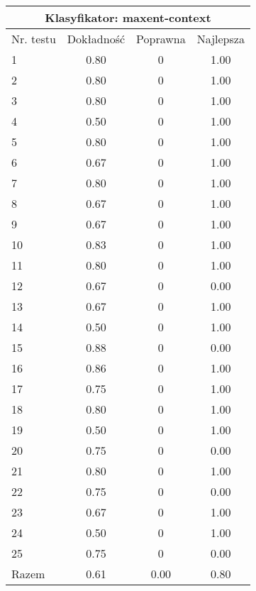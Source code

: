 \begin{tabular}{|l|c|c|c|}
\hline
\multicolumn{4}{|c|}{Klasyfikator: maxent-context}\\
\hline
Nr. testu & Dokładność & Poprawna & Najlepsza\\
\hline
1 & 0.80 & 0 & 1.00 \\
2 & 0.80 & 0 & 1.00 \\
3 & 0.80 & 0 & 1.00 \\
4 & 0.50 & 0 & 1.00 \\
5 & 0.80 & 0 & 1.00 \\
6 & 0.67 & 0 & 1.00 \\
7 & 0.80 & 0 & 1.00 \\
8 & 0.67 & 0 & 1.00 \\
9 & 0.67 & 0 & 1.00 \\
10 & 0.83 & 0 & 1.00 \\
11 & 0.80 & 0 & 1.00 \\
12 & 0.67 & 0 & 0.00 \\
13 & 0.67 & 0 & 1.00 \\
14 & 0.50 & 0 & 1.00 \\
15 & 0.88 & 0 & 0.00 \\
16 & 0.86 & 0 & 1.00 \\
17 & 0.75 & 0 & 1.00 \\
18 & 0.80 & 0 & 1.00 \\
19 & 0.50 & 0 & 1.00 \\
20 & 0.75 & 0 & 0.00 \\
21 & 0.80 & 0 & 1.00 \\
22 & 0.75 & 0 & 0.00 \\
23 & 0.67 & 0 & 1.00 \\
24 & 0.50 & 0 & 1.00 \\
25 & 0.75 & 0 & 0.00 \\
\hline
Razem & 0.61 & 0.00 & 0.80 \\
\hline
\end{tabular}
